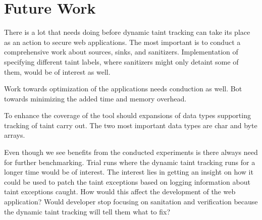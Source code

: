 \chapter{Future Work}

There is a lot that needs doing before dynamic taint tracking can take its place as an action to secure web applications. The most important is to conduct a comprehensive work about sources, sinks, and sanitizers. Implementation of specifying different taint labels, where sanitizers might only detaint some of them, would be of interest as well.

Work towards optimization of the applications needs conduction as well. Bot towards minimizing the added time and memory overhead.

To enhance the coverage of the tool should expansions of data types supporting tracking of taint carry out. The two most important data types are char and byte arrays. 

Even though we see benefits from the conducted experiments is there always need for further benchmarking. Trial runs where the dynamic taint tracking runs for a longer time would be of interest. The interest lies in getting an insight on how it could be used to patch the taint exceptions based on logging information about taint exceptions caught. How would this affect the development of the web application? Would developer stop focusing on sanitation and verification because the dynamic taint tracking will tell them what to fix?